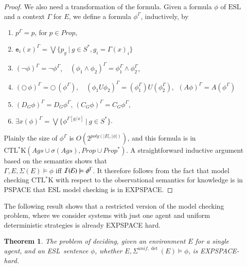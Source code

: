 \documentclass[a4wide]{article}
\newcommand{\CTLsK}{\mbox{CTL$^*$K}}
\newcommand{\ESL}{\mbox{ESL}}
\newcommand{\until}{U}
\newcommand{\Prop}{Prop}
\newcommand{\ets}{{\cal E}}
\newtheorem{theorem}{Theorem}
\theoremstyle{examplesty}
\newcommand{\strat}{\sigma}
\newcommand{\Ags}{\mathit{Ags}}
\newcommand{\I}{\mathcal{I}}
\newcommand{\lid}[2]{\mathtt{e}_{#1}(#2)}
\newcommand{\Env}{E}
\newcommand{\be}{\begin{enumerate}}
\newcommand{\ee}{\end{enumerate}}
\newcommand{\nxt}{\Circle}
\newcommand{\unif}{\mathit{unif}}
\newcommand{\Strat}{\Sigma}
\newcommand{\Cont}{\Gamma}
\begin{document}
\begin{proof}
We also need a transformation of the formula. 
Given a formula $\phi$ of $\ESL$ and a context $\Cont$ for $\Env$, 
we define a formula $\phi^\Cont$, inductively, by 
\be
\item $p^\Cont = p$, for $p\in \Prop$, 
\item $\lid{i}{x}^\Cont = 
\bigvee \{ p_g ~|~ {g\in S^*, g_i =\Cont(x)_i} \}$  
\item $(\neg \phi)^\Cont = \neg \phi^\Cont$, ~ $(\phi_1\land \phi_2)^\Cont = \phi_1^\Cont \land \phi_2^\Cont$, 
\item $(\nxt \,\phi)^\Cont = \nxt \,(\phi^\Cont)$, ~ $(\phi_1\until \phi_2)^\Cont = (\phi_1^\Cont )\until (\phi_2^\Cont), 
~~(A\phi)^\Cont = A(\phi^\Cont)$ 
\item $(D_G\phi)^\Cont = D_G \phi^\Cont$, $(C_G\phi)^\Cont = C_G \phi^\Cont$,
\item $\exists x(\phi)^\Cont = 
\bigvee \{ \phi^{\Cont[g/x]} ~|~ {g\in S^*}\} $. 
\ee 
Plainly the size of $\phi^\Cont$ is $O(2^{poly(|E|,|\phi|)})$, and this
formula is in $\CTLsK(
\Ags
\cup \strat(\Ags), \Prop\cup \Prop^*)$. 
A straightforward inductive argument based on the semantics shows that \\
$\Cont, \Env, \Strat(\Env) \models \phi$ iff $\I(\ets) \models \phi^\Cont$. 
It therefore follows from the fact that  model checking $\CTLsK$ 
with respect to the observational semantics for knowledge is in 
PSPACE that $\ESL$ model checking is in EXPSPACE. 
\end{proof} 


The following result shows that a restricted version of the model checking problem, 
where we consider systems with just one agent and uniform deterministic strategies is already EXPSPACE hard. 

\newcommand{\blnk}{\bot}  

\begin{theorem}\label{mcESLlower}
The problem  of deciding,  given an environment $\Env$ for a single agent, and an \ESL\ sentence $\phi$, 
whether $\Env,\Strat^{\unif,\det}(\Env)\models \phi$, is EXPSPACE-hard. 
\end{theorem}
 
\end{document}
